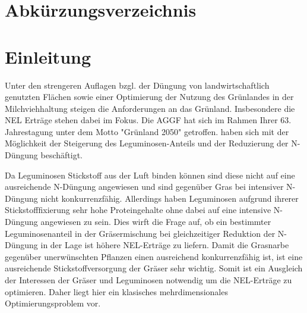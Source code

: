 \documentclass[12pt,titlepage]{scrartcl}
\begin{document}



\setlength{\parskip}{9pt} %
\newpage %
\clearpairofpagestyles %
\ohead{\headmark} %
\ofoot{\pagemark} %
\renewcommand*{\sectionmarkformat}{} %
\setcounter{page}{2} %


\tableofcontents



\section*{Abkürzungsverzeichnis}
\begin{acronym}[AGGF] %
\end{acronym}
\newpage

\section{Einleitung}
\label{sec:Einleitung}

Unter den strengeren Auflagen bzgl. der Düngung von landwirtschaftlich genutzten Flächen sowie einer Optimierung der Nutzung des Grünlandes in der Milchviehhaltung steigen die Anforderungen an das Grünland.
Insbesondere die \ac{NEL} Erträge stehen dabei im Fokus.
Die \ac{AGGF} hat sich im Rahmen Ihrer 63. Jahrestagung unter dem Motto "Grünland 2050" getroffen.
\textcite[33-36]{weggler2050leguminosen} haben sich mit der Möglichkeit der Steigerung des Leguminosen-Anteils und der Reduzierung der N-Düngung beschäftigt.

Da Leguminosen Stickstoff aus der Luft binden können sind diese nicht auf eine ausreichende N-Düngung angewiesen und sind gegenüber Gras bei intensiver N-Düngung nicht konkurrenzfähig.
Allerdings haben Leguminosen aufgrund ihrerer Stickstofffixierung sehr hohe Proteingehalte ohne dabei auf eine intensive N-Düngung angewiesen zu sein.
Dies wirft die Frage auf, ob ein bestimmter Leguminosenanteil in der Gräsermischung bei gleichzeitiger Reduktion der N-Düngung in der Lage ist höhere \ac{NEL}-Erträge zu liefern.
Damit die Grasnarbe gegenüber unerwünschten Pflanzen einen ausreichend konkurrenzfähig ist, ist eine ausreichende Stickstoffversorgung der Gräser sehr wichtig.
Somit ist ein Ausgleich der Interessen der Gräser und Leguminosen notwendig um die \ac{NEL}-Erträge zu optimieren.
Daher liegt hier ein klasisches mehrdimensionales Optimierungsproblem vor.
\end{document}
